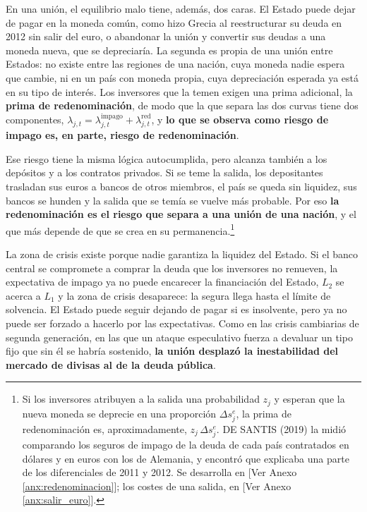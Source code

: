 \documentclass[10pt,a4paper]{article}
\newcommand{\authorfont}[1]{{\fontfamily{EBGaramond-TLF}\selectfont #1}}
\begin{document}
En una unión, el equilibrio malo tiene, además, dos caras. El Estado puede dejar de pagar en la moneda común, como hizo Grecia al reestructurar su deuda en 2012 sin salir del euro, o abandonar la unión y convertir sus deudas a una moneda nueva, que se depreciaría. La segunda es propia de una unión entre Estados: no existe entre las regiones de una nación, cuya moneda nadie espera que cambie, ni en un país con moneda propia, cuya depreciación esperada ya está en su tipo de interés. Los inversores que la temen exigen una prima adicional, la \textbf{prima de redenominación}, de modo que la que separa las dos curvas tiene dos componentes, $\lambda_{j,t}=\lambda^{\text{impago}}_{j,t}+\lambda^{\text{red}}_{j,t}$, y \textbf{lo que se observa como riesgo de impago es, en parte, riesgo de redenominación}.

Ese riesgo tiene la misma lógica autocumplida, pero alcanza también a los depósitos y a los contratos privados. Si se teme la salida, los depositantes trasladan sus euros a bancos de otros miembros, el país se queda sin liquidez, sus bancos se hunden y la salida que se temía se vuelve más probable. Por eso \textbf{la redenominación es el riesgo que separa a una unión de una nación}, y el que más depende de que se crea en su permanencia.\footnote{%
    Si los inversores atribuyen a la salida una probabilidad $z_j$ y esperan que la nueva moneda se deprecie en una proporción $\Delta s_j^{e}$, la prima de redenominación es, aproximadamente, $z_j\,\Delta s_j^{e}$. DE SANTIS (2019) la midió comparando los seguros de impago de la deuda de cada país contratados en dólares y en euros con los de Alemania, y encontró que explicaba una parte de los diferenciales de 2011 y 2012. Se desarrolla en [\authorfont{Ver Anexo \ref{anx:redenominacion}}]; los costes de una salida, en [\authorfont{Ver Anexo \ref{anx:salir_euro}}].
}

La zona de crisis existe porque nadie garantiza la liquidez del Estado. Si el banco central se compromete a comprar la deuda que los inversores no renueven, la expectativa de impago ya no puede encarecer la financiación del Estado, $L_2$ se acerca a $L_1$ y la zona de crisis desaparece: la segura llega hasta el límite de solvencia. El Estado puede seguir dejando de pagar si es insolvente, pero ya no puede ser forzado a hacerlo por las expectativas. Como en las crisis cambiarias de segunda generación, en las que un ataque especulativo fuerza a devaluar un tipo fijo que sin él se habría sostenido, \textbf{la unión desplazó la inestabilidad del mercado de divisas al de la deuda pública}.
\end{document}
